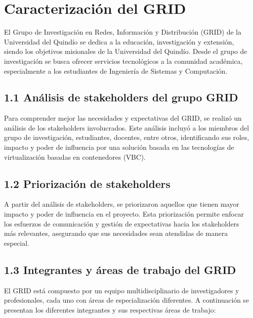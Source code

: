 \chapter*{Caracterización del GRID}
\label{cap:caracterizacionGRID}
El Grupo de Investigación en Redes, Información y Distribución (GRID) de la Universidad del Quindío se dedica a la educación, 
investigación y extensión, siendo los objetivos misionales de la Universidad del Quindío. Desde el grupo de investigación se busca ofrecer servicios tecnológicos
a la comunidad académica, especialmente a los estudiantes de Ingeniería de Sistemas y Computación.

\section*{1.1 Análisis de stakeholders del grupo GRID}

Para comprender mejor las necesidades y expectativas del GRID, se realizó un análisis de los stakeholders involucrados. Este análisis incluyó a los miembros del grupo de investigación, estudiantes, 
docentes, entre otros, identificando sus roles, impacto y poder de influencia por una solución basada en las tecnologías de virtualización basadas en contenedores (VBC).



\section*{1.2 Priorización de stakeholders}
A partir del análisis de stakeholders, se priorizaron aquellos que tienen mayor impacto y poder de influencia en el proyecto. Esta priorización permite enfocar los esfuerzos de comunicación y gestión de expectativas hacia
los stakeholders más relevantes, asegurando que sus necesidades sean atendidas de manera especial.



\section*{1.3 Integrantes y áreas de trabajo del GRID}

El GRID está compuesto por un equipo multidisciplinario de investigadores y profesionales, cada uno con áreas de especialización diferentes. A continuación se presentan los diferentes integrantes y sus respectivas áreas de trabajo:

